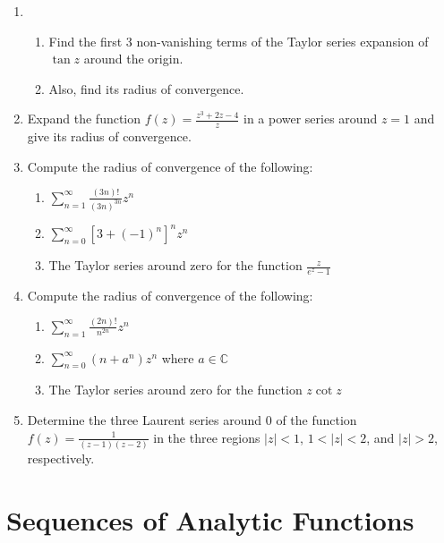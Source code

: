 \documentclass[a4paper,10pt]{article}
\begin{document}
\begin{enumerate}
 	\item 
 	
 	\begin{enumerate}
 		\item Find the first 3 non-vanishing terms of the Taylor series expansion of $\tan z$ around the origin.
 		
 		\item Also, find its radius of convergence.
 	\end{enumerate}
 	
 	\item Expand the function $f(z) = \frac{z^3 + 2z - 4}{z}$ in a power series around $z = 1$ and give its radius of convergence.
 	
 	\item Compute the radius of convergence of the following:
 	
 	\begin{enumerate}
 		\item $\sum_{n = 1}^{\infty} \frac{(3n)!}{(3n)^{3n}} z^n$
 		
 		\item $\sum_{n = 0}^{\infty} [3 + (-1)^n]^n z^n$
 		
 		\item The Taylor series around zero for the function $\frac{z}{e^z - 1}$
 	\end{enumerate}
 	
 	\item Compute the radius of convergence of the following:
 	
 	\begin{enumerate}
 		\item $\sum_{n = 1}^{\infty} \frac{(2n)!}{n^{2n}} z^n$
 		
 		\item $\sum_{n = 0}^{\infty} (n + a^n) z^n$ where $a \in \mathbb{C}$
 		
 		\item The Taylor series around zero for the function $z \cot z$
 	\end{enumerate}
 	
 	\item Determine the three Laurent series around 0 of the function $f(z) = \frac{1}{(z - 1)(z - 2)}$ in the three regions $|z| < 1$, $1 < |z| < 2$, and $|z| > 2$, respectively.
 	
\end{enumerate}

\newpage 
\section{Sequences of Analytic Functions}
\end{document}
